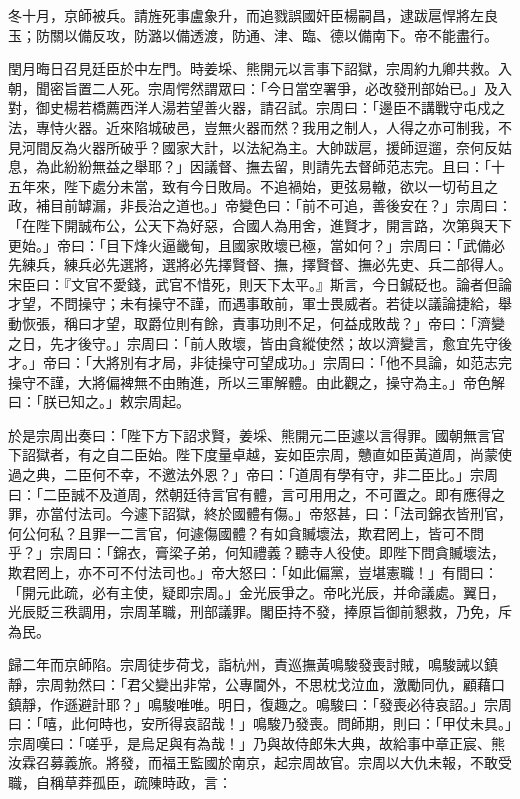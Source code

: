 \begin{pinyinscope}
冬十月，京師被兵。請旌死事盧象升，而追戮誤國奸臣楊嗣昌，逮跋扈悍將左良玉；防關以備反攻，防潞以備透渡，防通、津、臨、德以備南下。帝不能盡行。

閏月晦日召見廷臣於中左門。時姜埰、熊開元以言事下詔獄，宗周約九卿共救。入朝，聞密旨置二人死。宗周愕然謂眾曰：「今日當空署爭，必改發刑部始已。」及入對，御史楊若橋薦西洋人湯若望善火器，請召試。宗周曰：「邊臣不講戰守屯戍之法，專恃火器。近來陷城破邑，豈無火器而然？我用之制人，人得之亦可制我，不見河間反為火器所破乎？國家大計，以法紀為主。大帥跋扈，援師逗遛，奈何反姑息，為此紛紛無益之舉耶？」因議督、撫去留，則請先去督師范志完。且曰：「十五年來，陛下處分未當，致有今日敗局。不追禍始，更弦易轍，欲以一切茍且之政，補目前罅漏，非長治之道也。」帝變色曰：「前不可追，善後安在？」宗周曰：「在陛下開誠布公，公天下為好惡，合國人為用舍，進賢才，開言路，次第與天下更始。」帝曰：「目下烽火逼畿甸，且國家敗壞已極，當如何？」宗周曰：「武備必先練兵，練兵必先選將，選將必先擇賢督、撫，擇賢督、撫必先吏、兵二部得人。宋臣曰：『文官不愛錢，武官不惜死，則天下太平。』斯言，今日鍼砭也。論者但論才望，不問操守；未有操守不謹，而遇事敢前，軍士畏威者。若徒以議論捷給，舉動恢張，稱曰才望，取爵位則有餘，責事功則不足，何益成敗哉？」帝曰：「濟變之日，先才後守。」宗周曰：「前人敗壞，皆由貪縱使然；故以濟變言，愈宜先守後才。」帝曰：「大將別有才局，非徒操守可望成功。」宗周曰：「他不具論，如范志完操守不謹，大將偏裨無不由賄進，所以三軍解體。由此觀之，操守為主。」帝色解曰：「朕已知之。」敕宗周起。

於是宗周出奏曰：「陛下方下詔求賢，姜埰、熊開元二臣遽以言得罪。國朝無言官下詔獄者，有之自二臣始。陛下度量卓越，妄如臣宗周，戇直如臣黃道周，尚蒙使過之典，二臣何不幸，不邀法外恩？」帝曰：「道周有學有守，非二臣比。」宗周曰：「二臣誠不及道周，然朝廷待言官有體，言可用用之，不可置之。即有應得之罪，亦當付法司。今遽下詔獄，終於國體有傷。」帝怒甚，曰：「法司錦衣皆刑官，何公何私？且罪一二言官，何遽傷國體？有如貪贓壞法，欺君罔上，皆可不問乎？」宗周曰：「錦衣，膏梁子弟，何知禮義？聽寺人役使。即陛下問貪贓壞法，欺君罔上，亦不可不付法司也。」帝大怒曰：「如此偏黨，豈堪憲職！」有間曰：「開元此疏，必有主使，疑即宗周。」金光辰爭之。帝叱光辰，并命議處。翼日，光辰貶三秩調用，宗周革職，刑部議罪。閣臣持不發，捧原旨御前懇救，乃免，斥為民。

歸二年而京師陷。宗周徒步荷戈，詣杭州，責巡撫黃鳴駿發喪討賊，鳴駿誡以鎮靜，宗周勃然曰：「君父變出非常，公專閫外，不思枕戈泣血，激勵同仇，顧藉口鎮靜，作遜避計耶？」鳴駿唯唯。明日，復趣之。鳴駿曰：「發喪必待哀詔。」宗周曰：「嘻，此何時也，安所得哀詔哉！」鳴駿乃發喪。問師期，則曰：「甲仗未具。」宗周嘆曰：「嗟乎，是烏足與有為哉！」乃與故侍郎朱大典，故給事中章正宸、熊汝霖召募義旅。將發，而福王監國於南京，起宗周故官。宗周以大仇未報，不敢受職，自稱草莽孤臣，疏陳時政，言：


\end{pinyinscope}

